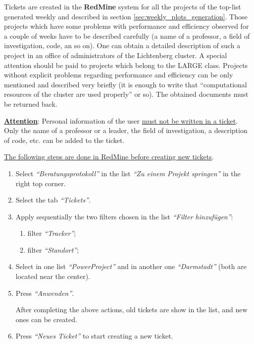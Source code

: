 \documentclass[12pt,a4paper,onecolumn]{article}
\begin{document}
Tickets are created in the \textbf{RedMine} system for all the projects of the top-list generated weekly and described in section \ref{sec:weekly_plots_generation}.
Those projects which have some problems with performance and efficiency observed for a couple of weeks have to be described carefully (a name of a professor, a field of investigation, code, an so on).
One can obtain a detailed description of such a project in an office of administrators of the Lichtenberg cluster.
A special attention should be paid to projects which belong to the LARGE class.
Projects without explicit problems regarding performance and efficiency can be only mentioned and described very briefly (it is enough to write that ``computational resources of the cluster are used properly'' or so).
The obtained documents must be returned back.
\vspace{\baselineskip}

\underline{\textbf{Attention}}: Personal information of the user \underline{must not be written in a ticket}.
Only the name of a professor or a leader, the field of investigation, a description of code, etc. can be added to the ticket.
\vspace{\baselineskip}

\underline{The following steps are done in RedMine before creating new tickets}.

\begin{enumerate}

\item Select \textit{``Beratungsprotokoll''} in the list \textit{``Zu einem Projekt springen''} in the right top corner.

\item Select the tab \textit{``Tickets''}.

\item Apply sequentially the two filters chosen in the list \textit{``Filter hinzuf\"ugen''}:
\begin{enumerate}
\item filter \textit{``Tracker''};
\item filter \textit{``Standort''};
\end{enumerate}

\item Select in one list \textit{``PowerProject''} and in another one \textit{``Darmstadt''} (both are located near the center).

\item Press \textit{``Anwenden''}.

After completing the above actions, old tickets are show in the list, and new ones can be created.

\item Press \textit{``Neues Ticket''} to start creating a new ticket.

\end{enumerate}
\end{document}
